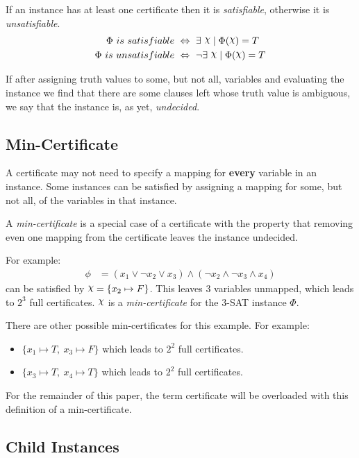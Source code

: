 If an instance has at least one certificate then it is \textit{satisfiable}, otherwise it is \textit{unsatisfiable}.
\begin{align*}
    \Phi~ is~ satisfiable~ & \Leftrightarrow~ \exists~ \rchi \mid \Phi(\rchi) = T \\
    \Phi~ is~ unsatisfiable~ & \Leftrightarrow~ \lnot \exists~ \rchi \mid \Phi(\rchi) = T
\end{align*}

If after assigning truth values to some, but not all, variables and evaluating the instance we find that there are some clauses left whose truth value is ambiguous, we say that the instance is, as yet, \textit{undecided}.


\subsection{Min-Certificate}
\label{subsec:min-certificate}

A certificate may not need to specify a mapping for \textbf{every} variable in an instance.
Some instances can be satisfied by assigning a mapping for some, but not all, of the variables in that instance.

A \textit{min-certificate} is a special case of a certificate with the property that removing even one mapping from the certificate leaves the instance undecided.

For example:
\begin{align*}
    \phi & = (x_1 \lor \lnot x_2 \lor x_3) \land (\lnot x_2 \land \lnot x_3 \land x_4)
\end{align*}
can be satisfied by $ \rchi = \{ x_2 \mapsto F \} $.
This leaves $3$ variables unmapped, which leads to $2^3$ full certificates.
$\rchi$ is a \textit{min-certificate} for the 3-SAT instance $\Phi$.

There are other possible min-certificates for this example.
For example:
\begin{itemize}
    \item $\{ x_1 \mapsto T,~ x_3 \mapsto F \}$ which leads to $2^2$ full certificates.
    \item $\{ x_3 \mapsto T,~ x_4 \mapsto T \}$ which leads to $2^2$ full certificates.
\end{itemize}

For the remainder of this paper, the term certificate will be overloaded with this definition of a min-certificate.


\subsection{Child Instances}
\label{subsec:child-instances}


